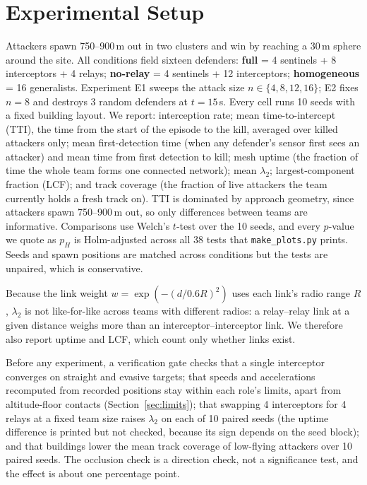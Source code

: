 \documentclass[10pt,twocolumn]{article}
\begin{document}
\section{Experimental Setup}
\label{sec:setup}
Attackers spawn 750--900\,m out in two clusters and win by reaching a
30\,m sphere around the site. All conditions field sixteen defenders:
\textbf{full} = 4 sentinels + 8 interceptors + 4 relays;
\textbf{no-relay} = 4 sentinels + 12 interceptors;
\textbf{homogeneous} = 16 generalists. Experiment E1 sweeps the attack size
$n\in\{4,8,12,16\}$; E2 fixes $n{=}8$ and destroys 3 random defenders at
$t{=}15$\,s. Every cell runs 10 seeds with a fixed building layout. We
report: interception rate; mean time-to-intercept (TTI), the time from the
start of the episode to the kill, averaged over killed attackers only;
mean first-detection time (when any defender's sensor first sees an
attacker) and mean time from first detection to kill; mesh uptime (the
fraction of time the whole team forms one connected network); mean
$\lambda_2$; largest-component fraction (LCF); and track coverage (the
fraction of live attackers the team currently holds a fresh track on).
TTI is dominated by approach geometry, since attackers spawn 750--900\,m
out, so only differences between teams are informative. Comparisons use
Welch's $t$-test over the 10 seeds, and every $p$-value we quote as
$p_H$ is Holm-adjusted across all 38 tests that \texttt{make\_plots.py}
prints. Seeds and spawn positions are matched across conditions but the
tests are unpaired, which is conservative.

Because the link weight $w=\exp(-(d/0.6R)^2)$ uses each link's radio range
$R$, $\lambda_2$ is not like-for-like across teams with different radios:
a relay--relay link at a given distance weighs more than an
interceptor--interceptor link. We therefore also report uptime and LCF,
which count only whether links exist.

Before any experiment, a verification gate checks that a single interceptor
converges on straight and evasive targets; that speeds and accelerations
recomputed from recorded positions stay within each role's limits, apart
from altitude-floor contacts (Section~\ref{sec:limits}); that swapping 4
interceptors for 4 relays at a fixed team size raises $\lambda_2$ on each of
10 paired seeds (the uptime difference is printed but not checked, because
its sign depends on the seed block); and that buildings lower the mean
track coverage of low-flying attackers over 10 paired seeds. The occlusion
check is a direction check, not a significance test, and the effect is
about one percentage point.
\end{document}
